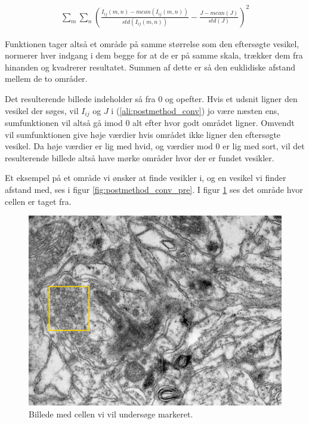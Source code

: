 \begin{align}
	\sum_m\sum_n \left(\frac{I_{ij}(m,n)-mean(I_{ij}(m,n))}{std(I_{ij}(m,n))}-\frac{J-mean(J)}{std(J)}\right)^2 \label{ali:postmethod_conv}
\end{align}

Funktionen tager altså et område på samme størrelse som den eftersøgte vesikel, normerer hver indgang i dem begge for at de er på samme skala, trækker dem fra hinanden og kvadrerer resultatet. Summen af dette er så den euklidiske afstand mellem de to områder.

Det resulterende billede indeholder så fra 0 og opefter. Hvis et udsnit ligner den vesikel der søges, vil $I_{ij}$ og $J$ i (\ref{ali:postmethod_conv}) jo være næsten ens, sumfunktionen vil altså gå imod 0 alt efter hvor godt området ligner. Omvendt vil sumfunktionen give høje værdier hvis området ikke ligner den eftersøgte vesikel. Da høje værdier er lig med hvid, og værdier mod 0 er lig med sort, vil det resulterende billede altså have mørke områder hvor der er fundet vesikler. 

Et eksempel på et område vi ønsker at finde vesikler i, og en vesikel vi finder afstand med, ses i figur \ref{fig:postmethod_conv_pre}. I figur \ref{fig:postmethod_conv_area1} ses det område hvor cellen er taget fra.

\begin{figure}[H]
		\centering
		\includegraphics[scale=0.5]{files/postmethod/img/area_1.png}
	\caption{Billede med cellen vi vil undersøge markeret.\label{fig:postmethod_conv_area1}}
\end{figure}

